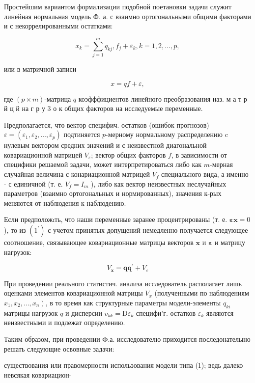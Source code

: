 \documentclass[10pt]{article}
\begin{document}
Простейшим вариантом формализации подобной поетановки задачи служит линейная нормальная модель Ф. а. с взаимно ортогональными общими факторами и с некоррелированными остатками:



\[

x_{k}=\sum_{j=1}^{m} q_{k j}, f_{j}+\varepsilon_{k}, k=1,2, \ldots, p,

\]



или в матричной записи



\[

x=q f+\varepsilon,

\]



где $(p \times m)$-матрица $q$ коэфффициентов линейного преобразования наз. м а т р й ц й на г р у 3 о к общих факторов на исследуемые переменные.



Предполагается, что вектор специфич. остатков (ошибок прогнозов) $\varepsilon=\left(\varepsilon_{1}, \varepsilon_{2}, \ldots, \varepsilon_{p}\right)$ подтиняется $p$-мерному нормальному распределению $\mathrm{c}$ нулевым вектором средних значений и с неизвестной диагональной ковариационной матрицей $V_{\varepsilon}$; вектор общих факторов $f$, в зависимости от специфики решаемой задачи, может интерпретироваться либо как $m$-мерная случайная величина с конариационной матрицей $V_{f}$ специального вида, а именно - с единичной (т. е. $V_{f}=I_{m}$ ), либо как вектор неизвестных неслучайных параметров (взаимно ортогональных и нормированных), значения к-рых меняются от наблюдения к наблюдению.



Если предположıть, что наши переменные заранее процентрированы (т. е. $\boldsymbol{\varepsilon} \boldsymbol{x}=0$ ), то из $\left(1^{\prime}\right)$ с учетом принятых допущений немедленно получается следующее соотношение, связывающее ковариационные матрицы векторов $\boldsymbol{x}$ и $\boldsymbol{\varepsilon}$ и матрицу нагрузок:



\[

V_{\boldsymbol{x}}=\boldsymbol{q} \boldsymbol{q}^{\prime}+V_{\varepsilon}

\]



При проведении реального статистич. анализа исследователь располагает лишь оценками элементов ковариационной матрицы $V_{x}$ (полученными по наблюдениям $\left.x_{1}, x_{2}, \ldots, x_{n}\right)$, в то время как структурные параметры модели-элементы $q_{k i}$ матрицы нагрузок $q$ и дисперсии $v_{k k}=\mathrm{D} \varepsilon_{k}$ специфи'г. остатков $\varepsilon_{k}$ являются неизвестными и подлежат определению.



Таким образом, при проведении Ф.а. исследователю приходится последонателыно решать следующие освовные задачи:



существования или правомерности использования модели типа (1); ведь далеко невсякая ковариацион-
\end{document}
